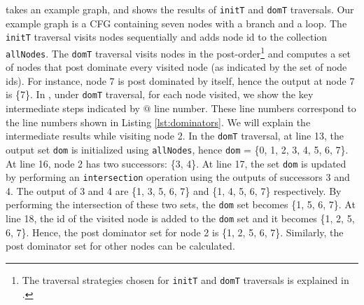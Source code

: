 
 takes an example graph, and shows the results of
\lstinline|initT| and \lstinline|domT| traversals. Our example graph is a CFG
containing seven nodes with a branch and a loop. The \lstinline|initT| traversal
visits nodes sequentially and adds node id to the collection
\lstinline|allNodes|. The \lstinline|domT| traversal visits nodes in the
post-order\footnote{The traversal strategies chosen for \lstinline|initT| and
\lstinline|domT| traversals is explained in .} and
computes a set of nodes that post dominate every visited node (as indicated by
the set of node ids). For instance, node 7 is post dominated by itself, hence
the output at node 7 is \{7\}.
In , under \lstinline|domT| traversal, for each
node visited, we show the key intermediate steps indicated by $@$ line number.
These line numbers correspond to the line numbers shown in Listing
\ref{lst:dominators}. We will explain the intermediate results while visiting
node 2. In the \lstinline|domT| traversal, at line 13, the output set
\lstinline|dom| is initialized using \lstinline|allNodes|, hence \lstinline|dom|
= \{0, 1, 2, 3, 4, 5, 6, 7\}. At line 16, node 2 has two successors: \{3, 4\}.
At line 17, the set \lstinline|dom| is updated by performing an
\lstinline|intersection| operation using the outputs of successors 3 and 4. The
output of 3 and 4 are \{1, 3, 5, 6, 7\} and \{1, 4, 5, 6, 7\} respectively. By
performing the intersection of these two sets, the \lstinline|dom| set becomes
\{1, 5, 6, 7\}. At line 18, the id of the visited node is added to the
\lstinline|dom| set and it becomes \{1, 2, 5, 6, 7\}.
Hence, the post dominator set for node 2 is \{1, 2, 5, 6, 7\}. Similarly,
the post dominator set for other nodes can be calculated.

